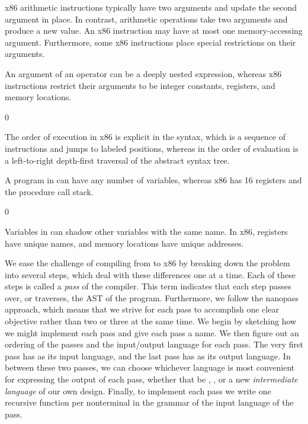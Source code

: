 \documentclass[7x10]{TimesAPriori_MIT}%
\def\racketEd{0}
\providecommand{\BookEdition}{1}
\let\edition\BookEdition
\numberwithin{theorem}{chapter}
\numberwithin{definition}{chapter}
\numberwithin{equation}{chapter}
\begin{document}
\begin{enumerate}
\item x86 arithmetic instructions typically have two arguments and
  update the second argument in place. In contrast, \LangVar{}
  arithmetic operations take two arguments and produce a new value.
  An x86 instruction may have at most one memory-accessing argument.
  Furthermore, some x86 instructions place special restrictions on
  their arguments.

\item An argument of an \LangVar{} operator can be a deeply nested
  expression, whereas x86 instructions restrict their arguments to be
  integer constants, registers, and memory locations.

{\if\edition\racketEd      
\item The order of execution in x86 is explicit in the syntax, which
  is a sequence of instructions and jumps to labeled positions,
  whereas in \LangVar{} the order of evaluation is a left-to-right
  depth-first traversal of the abstract syntax tree.  \fi}

\item A program in \LangVar{} can have any number of variables,
  whereas x86 has 16 registers and the procedure call stack.
{\if\edition\racketEd    
\item Variables in \LangVar{} can shadow other variables with the
  same name. In x86, registers have unique names, and memory locations
  have unique addresses.
\fi}  
\end{enumerate}

We ease the challenge of compiling from \LangVar{} to x86 by breaking
down the problem into several steps, which deal with these differences
one at a time. Each of these steps is called a \emph{pass} of the
compiler.
%
This term indicates that each step passes over, or traverses, the AST
of the program.
%
Furthermore, we follow the nanopass approach, which means that we
strive for each pass to accomplish one clear objective rather than two
or three at the same time.
%
We begin by sketching how we might implement each pass and give each
pass a name.  We then figure out an ordering of the passes and the
input/output language for each pass. The very first pass has
\LangVar{} as its input language, and the last pass has \LangXInt{} as
its output language. In between these two passes, we can choose
whichever language is most convenient for expressing the output of
each pass, whether that be \LangVar{}, \LangXInt{}, or a new
\emph{intermediate language} of our own design.  Finally, to
implement each pass we write one recursive function per nonterminal in
the grammar of the input language of the pass.
\end{document}
